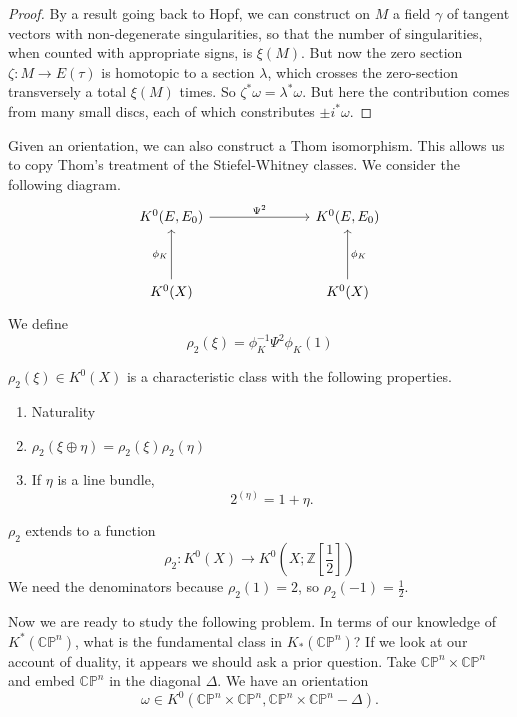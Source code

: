 \documentclass[../main]{subfiles}
\begin{document}
\begin{proof}
By a result going back to Hopf, we can construct on $M$ a field $\gamma$ of tangent vectors with non-degenerate singularities, so that the number of singularities, when counted with appropriate signs, is $\xi(M)$. But now the zero section $\zeta:M\longrightarrow E(\tau)$ is homotopic to a section $\lambda$, which crosses the zero-section transversely a total $\xi(M)$ times. So $\zeta^*\omega=\lambda^*\omega$. But here the contribution comes from many small discs, each of which constributes $\pm i^*\omega$.
\end{proof}
\par Given an orientation, we can also construct a Thom isomorphism. This allows us to copy Thom's treatment of the Stiefel-Whitney classes. We consider the following diagram.
$$\begin{tikzcd}
	K^0(E,E_0) &&& K^0(E,E_0) \\
	\\
	K^0(X) &&& K^0(X)
	\arrow["\phi_K", from=3-1, to=1-1]
	\arrow["\phi_K"', from=3-4, to=1-4]
	\arrow["\Psi^2", from=1-1, to=1-4]
\end{tikzcd}$$
We define 
$$\rho_2(\xi)=\phi_K^{-1}\Psi^2\phi_K(1)$$
\begin{proposition}\label{prop:p3ch11.5}
$\rho_2(\xi)\in K^0(X)$ is a characteristic class with the following properties.
\begin{enumerate}
    \item Naturality
    \item $\rho_2(\xi\oplus\eta)=\rho_2(\xi)\rho_2(\eta)$
    \item If $\eta$ is a line bundle,
    $$2^{(\eta)}=1+\eta.$$
\end{enumerate}
\end{proposition}
\begin{proposition}\label{prop:p3ch11.6}
$\rho_2$ extends to a function
$$\rho_2:K^0(X)\longrightarrow K^0\left(X;\mathbb{Z}\left[\frac{1}{2}\right]\right)$$
We need the denominators because $\rho_2(1)=2$, so $\rho_2(-1)=\frac{1}{2}$.
\end{proposition}
\par Now we are ready to study the following problem. In terms of our knowledge of $K^*(\mathbb{CP}^n)$, what is the fundamental class in $K_*(\mathbb{CP}^n)$? If we look at our account of duality, it appears we should ask a prior question. Take $\mathbb{CP}^n\times\mathbb{CP}^n$ and embed $\mathbb{CP}^n$ in the diagonal $\Delta$. We have an orientation 
$$\omega \in K^0(\mathbb{CP}^n\times\mathbb{CP}^n, \mathbb{CP}^n\times\mathbb{CP}^n -\Delta).$$
\end{document}
